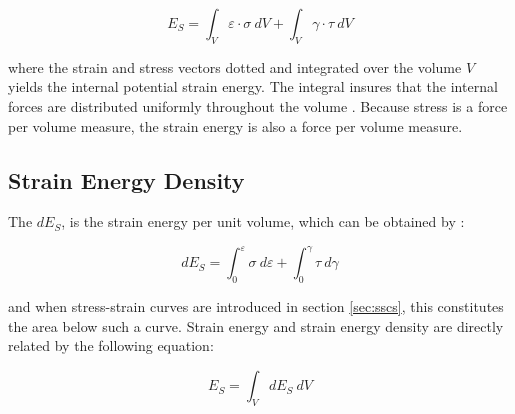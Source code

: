 \begin{equation}
\label{eq:strain_energy}
E_S = 
\int_{V} \varepsilon \cdot \sigma \ dV +
\int_{V} \gamma \cdot \tau \ dV
\end{equation}

where the strain and stress vectors dotted and integrated over the
volume $V$ yields the internal potential strain energy. The integral
insures that the internal forces are distributed uniformly throughout
the volume .
%
Because stress is a force per volume measure, the strain energy is
also a force per volume measure.

\subsection{Strain Energy Density}
The  $dE_S$, is the strain energy
per unit volume, which can be obtained by
:

\begin{equation}
\label{eq:strain_energy_density}
dE_S = 
\int_0^\varepsilon \sigma \ d \varepsilon  +
\int_0^\gamma \tau \ d \gamma 
\end{equation}

and when stress-strain curves are introduced in section
\vref{sec:sscs}, this constitutes the area below such a curve. Strain
energy and strain energy density are directly related by the following
equation:

\begin{equation}
\label{eq:strain_energy_density_integral}
E_S = 
\int_V dE_S \ dV
\end{equation}




